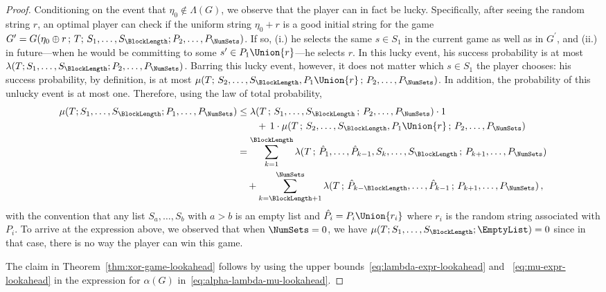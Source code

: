 \begin{proof}
Conditioning on the event that $\eta_0 \not \in \Lambda(G)$, 
we observe that the player can in fact be lucky. 
Specifically, after seeing the random string $r$, 
an optimal player can check if the uniform string $\eta_0 + r$ 
is a good initial string for the game $G^\prime = G(\eta_0 \oplus r\,;\, T;\,\SS{1}; \PP{2})$. 
If so, (i.) he selects the same $s \in S_1$ in the current game as well as in $G^\prime$, 
and (ii.) in future---when he would be committing to some $s^\prime \in P_1 \Union \{r\}$---he selects $r$. 
In this lucky event, his success probability is at most $\lambda(T;\SS{1}; \PP{2})$. 
Barring this lucky event, however, it does not matter which $s \in S_1$ the player chooses: 
his success probability, by definition, is at most $\mu(T;\,\SS{2}, P_1 \Union \{r\}\,;\, \PP{2})$.
In addition, the probability of this unlucky event is at most one. 
Therefore, using the law of total probability, 
\begin{align}\label{eq:mu-expr-lookahead}
    \mu(T; \Sfull; \Pfull)
    &\leq \lambda(T\,;\,\SS{1}\,;\, \PP{2})\cdot 1 \nonumber\\
    &\qquad +\,1\cdot \mu(T\,;\,\SS{2}, P_1 \Union \{r\}\,;\, \PP{2}) \nonumber\\
    &=      \sum_{k=1}^\BlockLength \lambda(T\,;\,\HatPP{1}{k-1}, \SS{k}\,;\, \PP{k+1}) \nonumber \\
    &\quad +  \sum_{k=\BlockLength + 1}^\NumSets \lambda(T\,;\,\HatPP{k-\BlockLength}{k-1}\,;\, \PP{k+1})
\, ,
\end{align}
with the convention that any list $S_a, \ldots, S_b$ with $a > b$ is an empty list 
and $\hat{P_i} = P_i \Union \{r_i\}$ where $r_i$ is the random string associated with $P_i$. 
To arrive at the expression above, 
we observed that when $\NumSets = 0$, we have $\mu(T; \Sfull; \EmptyList) = 0$ 
since in that case, there is no way the player can win this game. 

The claim in Theorem~\ref{thm:xor-game-lookahead} follows by 
using the upper bounds~\eqref{eq:lambda-expr-lookahead} and ~\eqref{eq:mu-expr-lookahead}
in the expression for $\alpha(G)$ in~\eqref{eq:alpha-lambda-mu-lookahead}.



\end{proof}
